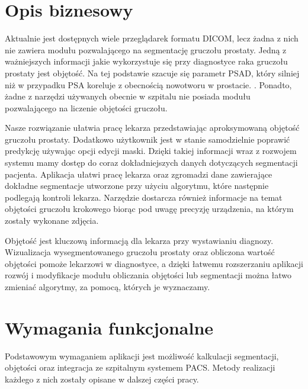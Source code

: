 \documentclass[a4paper,11pt,twoside]{report}
\theoremstyle{definition}
\begin{document}
\section{Opis biznesowy}

Aktualnie jest dostępnych wiele przeglądarek formatu DICOM, lecz żadna z nich nie zawiera modułu pozwalającego na segmentację gruczołu prostaty. Jedną z ważniejszych informacji jakie wykorzystuje się przy diagnostyce raka gruczołu prostaty jest objętość. Na tej podstawie szacuje się parametr PSAD, który silniej niż w przypadku PSA koreluje z obecnością nowotworu w prostacie. \cite{psadvspsa}. Ponadto, żadne z narzędzi używanych obecnie w szpitalu nie posiada modułu pozwalającego na liczenie objętości gruczołu.
\par
Nasze rozwiązanie ułatwia pracę lekarza przedstawiając aproksymowaną objętość gruczołu prostaty. Dodatkowo użytkownik jest w stanie samodzielnie poprawić predykcję używając opcji edycji maski. Dzięki takiej informacji wraz z rozwojem systemu mamy dostęp do coraz dokładniejszych danych dotyczących segmentacji pacjenta. Aplikacja ułatwi pracę lekarza oraz zgromadzi dane zawierające dokładne segmentacje utworzone przy użyciu algorytmu, które następnie podlegają kontroli lekarza. Narzędzie dostarcza również informacje na temat objętości gruczołu krokowego biorąc pod uwagę precyzję urządzenia, na którym zostały wykonane zdjęcia. 
\par
Objętość jest kluczową informacją dla lekarza przy wystawianiu diagnozy. Wizualizacja wysegmentowanego gruczołu prostaty oraz obliczona wartość objętości pomoże lekarzowi w diagnostyce, a dzięki łatwemu rozszerzaniu aplikacji rozwój i modyfikacje modułu obliczania objętości lub segmentacji można łatwo zmieniać algorytmy, za pomocą, których je wyznaczamy.

\section{Wymagania funkcjonalne}

Podstawowym wymaganiem aplikacji jest możliwość kalkulacji segmentacji, objętości oraz integracja ze szpitalnym systemem PACS. Metody realizacji każdego z nich zostały opisane w dalszej części pracy. 
\end{document}
